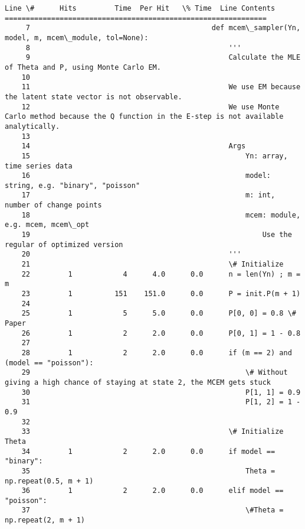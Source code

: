 \documentclass{article}
\begin{document}
\begin{Verbatim}[commandchars=\\\{\}]
Line \#      Hits         Time  Per Hit   \% Time  Line Contents
==============================================================
     7                                           def mcem\_sampler(Yn, model, m, mcem\_module, tol=None):
     8                                               '''
     9                                               Calculate the MLE of Theta and P, using Monte Carlo EM.
    10                                               
    11                                               We use EM because the latent state vector is not observable.
    12                                               We use Monte Carlo method because the Q function in the E-step is not available analytically.
    13                                           
    14                                               Args
    15                                                   Yn: array, time series data
    16                                                   model: string, e.g. "binary", "poisson"
    17                                                   m: int, number of change points
    18                                                   mcem: module, e.g. mcem, mcem\_opt
    19                                                       Use the regular of optimized version
    20                                               '''
    21                                               \# Initialize
    22         1            4      4.0      0.0      n = len(Yn) ; m = m
    23         1          151    151.0      0.0      P = init.P(m + 1)
    24                                           
    25         1            5      5.0      0.0      P[0, 0] = 0.8 \# Paper
    26         1            2      2.0      0.0      P[0, 1] = 1 - 0.8
    27                                           
    28         1            2      2.0      0.0      if (m == 2) and (model == "poisson"):
    29                                                   \# Without giving a high chance of staying at state 2, the MCEM gets stuck
    30                                                   P[1, 1] = 0.9
    31                                                   P[1, 2] = 1 - 0.9
    32                                           
    33                                               \# Initialize Theta
    34         1            2      2.0      0.0      if model == "binary":
    35                                                   Theta = np.repeat(0.5, m + 1)
    36         1            2      2.0      0.0      elif model == "poisson":
    37                                                   \#Theta = np.repeat(2, m + 1)

\end{Verbatim}
\end{document}
